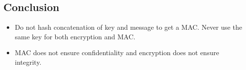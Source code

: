\subsection{Conclusion}
\begin{itemize}
    \item Do not hash concatenation of key and message to get a MAC.
        Never use the same key for both encryption and MAC.
    \item MAC does not ensure confidentiality and encryption does not ensure integrity.
\end{itemize}
